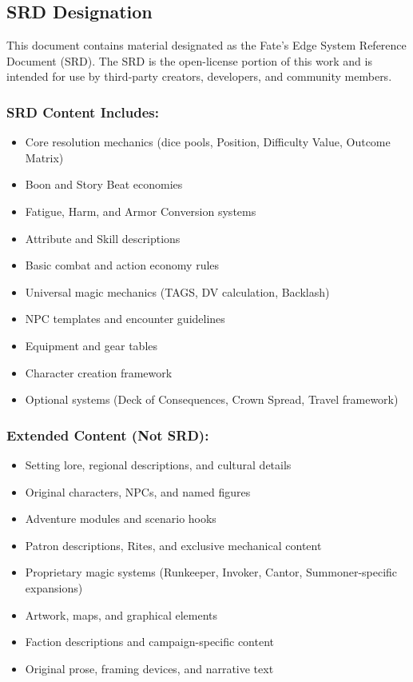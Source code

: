 \documentclass[10pt]{article}
\begin{document}
\vspace{0.5cm}

\subsection*{SRD Designation}

This document contains material designated as the Fate's Edge System Reference Document (SRD). The SRD is the open-license portion of this work and is intended for use by third-party creators, developers, and community members.

\subsubsection*{SRD Content Includes:}
\begin{itemize}
\item Core resolution mechanics (dice pools, Position, Difficulty Value, Outcome Matrix)
\item Boon and Story Beat economies
\item Fatigue, Harm, and Armor Conversion systems
\item Attribute and Skill descriptions
\item Basic combat and action economy rules
\item Universal magic mechanics (TAGS, DV calculation, Backlash)
\item NPC templates and encounter guidelines
\item Equipment and gear tables
\item Character creation framework
\item Optional systems (Deck of Consequences, Crown Spread, Travel framework)
\end{itemize}

\subsubsection*{Extended Content (Not SRD):}
\begin{itemize}
\item Setting lore, regional descriptions, and cultural details
\item Original characters, NPCs, and named figures
\item Adventure modules and scenario hooks
\item Patron descriptions, Rites, and exclusive mechanical content
\item Proprietary magic systems (Runkeeper, Invoker, Cantor, Summoner-specific expansions)
\item Artwork, maps, and graphical elements
\item Faction descriptions and campaign-specific content
\item Original prose, framing devices, and narrative text
\end{itemize}
\end{document}
